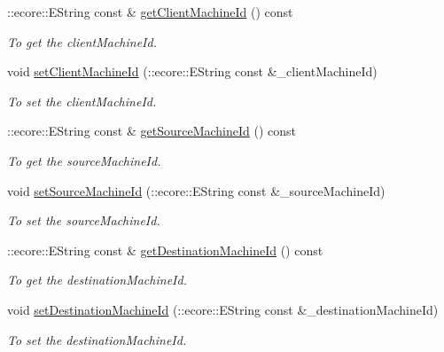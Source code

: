 \begin{DoxyCompactItemize}
::ecore::EString const \& \hyperlink{classFMS__Data_1_1FileTransfer_aad59fa6d74223b131db609648a6ac731}{getClientMachineId} () const 
\begin{DoxyCompactList}\small\item\em To get the clientMachineId. \item\end{DoxyCompactList}\item 
void \hyperlink{classFMS__Data_1_1FileTransfer_aba2dc8533be89d5ee4444459746711a2}{setClientMachineId} (::ecore::EString const \&\_\-clientMachineId)
\begin{DoxyCompactList}\small\item\em To set the clientMachineId. \item\end{DoxyCompactList}\item 
::ecore::EString const \& \hyperlink{classFMS__Data_1_1FileTransfer_a50b9c322e0f90034e4b06c19ecbac343}{getSourceMachineId} () const 
\begin{DoxyCompactList}\small\item\em To get the sourceMachineId. \item\end{DoxyCompactList}\item 
void \hyperlink{classFMS__Data_1_1FileTransfer_ac9397dec41ab888337de5d12ee8e34af}{setSourceMachineId} (::ecore::EString const \&\_\-sourceMachineId)
\begin{DoxyCompactList}\small\item\em To set the sourceMachineId. \item\end{DoxyCompactList}\item 
::ecore::EString const \& \hyperlink{classFMS__Data_1_1FileTransfer_aac3c42f45666464b0d01893ff0cb8691}{getDestinationMachineId} () const 
\begin{DoxyCompactList}\small\item\em To get the destinationMachineId. \item\end{DoxyCompactList}\item 
void \hyperlink{classFMS__Data_1_1FileTransfer_af9b48d3e38adfd7df60d36788d5c36aa}{setDestinationMachineId} (::ecore::EString const \&\_\-destinationMachineId)
\begin{DoxyCompactList}\small\item\em To set the destinationMachineId. \item\end{DoxyCompactList}\item 

\end{DoxyCompactItemize}

